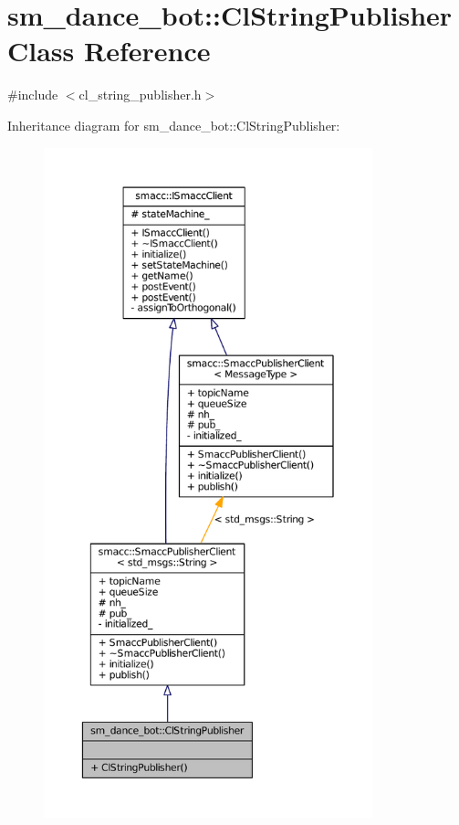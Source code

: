 \hypertarget{classsm__dance__bot_1_1ClStringPublisher}{}\section{sm\+\_\+dance\+\_\+bot\+:\+:Cl\+String\+Publisher Class Reference}
\label{classsm__dance__bot_1_1ClStringPublisher}


{\ttfamily \#include $<$cl\+\_\+string\+\_\+publisher.\+h$>$}



Inheritance diagram for sm\+\_\+dance\+\_\+bot\+:\+:Cl\+String\+Publisher\+:
\nopagebreak
\begin{figure}[H]
\begin{center}
\leavevmode
\includegraphics[height=550pt]{classsm__dance__bot_1_1ClStringPublisher__inherit__graph}
\end{center}
\end{figure}


